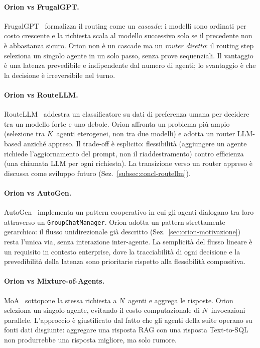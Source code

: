 \paragraph{Orion vs FrugalGPT.} FrugalGPT~\cite{chen2023frugalgpt} 
formalizza il routing come un \emph{cascade}: i modelli sono ordinati per costo crescente 
e la richiesta scala al modello successivo solo se il precedente non è abbastanza sicuro. 
Orion non è un cascade ma un \emph{router diretto}: il routing step seleziona un singolo agente in un solo passo, senza prove sequenziali. 
Il vantaggio è una latenza prevedibile e indipendente dal numero di agenti; lo svantaggio è che la decisione è irreversibile nel turno.

\paragraph{Orion vs RouteLLM.} RouteLLM~\cite{ong2024routellm} addestra un classificatore su dati 
di preferenza umana per decidere tra un modello forte e uno debole. 
Orion affronta un problema più ampio (selezione tra $K$~agenti eterogenei,
non tra due modelli) e adotta un router LLM-based anziché appreso. Il trade-off è esplicito: 
flessibilità (aggiungere un agente richiede l'aggiornamento del prompt, non il riaddestramento) 
contro efficienza (una chiamata LLM per ogni richiesta). 
La transizione verso un router appreso è discussa come sviluppo futuro (Sez.~\ref{subsec:concl-routellm}).

\paragraph{Orion vs AutoGen.} AutoGen~\cite{wu2023autogen} implementa un pattern cooperativo in cui gli agenti 
dialogano tra loro attraverso un \texttt{GroupChatManager}. Orion adotta un pattern strettamente gerarchico: 
il flusso unidirezionale già descritto (Sez.~\ref{sec:orion-motivazione}) resta l'unica via, 
senza interazione inter-agente. La semplicità del flusso lineare è un requisito in contesto enterprise, 
dove la tracciabilità di ogni decisione e la prevedibilità della latenza sono prioritarie rispetto alla flessibilità compositiva.

\paragraph{Orion vs Mixture-of-Agents.} MoA~\cite{wang2024moa} sottopone la stessa richiesta a $N$~agenti e aggrega le risposte. 
Orion seleziona un singolo agente, evitando il costo computazionale di $N$~invocazioni parallele. 
L'approccio è giustificato dal fatto che gli agenti della suite operano su fonti dati disgiunte: 
aggregare una risposta RAG con una risposta Text-to-SQL non produrrebbe una risposta migliore, ma solo rumore.

